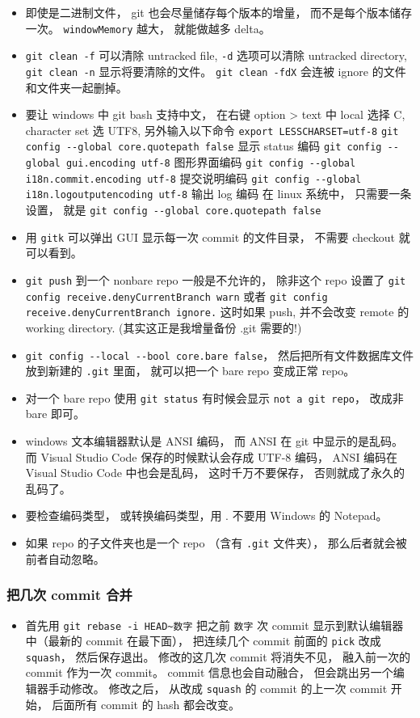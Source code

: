 \begin{itemize}
\item 即使是二进制文件， git 也会尽量储存每个版本的增量， 而不是每个版本储存一次。 \verb`windowMemory` 越大， 就能做越多 delta。
\item \verb`git clean -f` 可以清除 untracked file, \verb`-d` 选项可以清除 untracked directory,  \verb`git clean -n` 显示将要清除的文件。 \verb`git clean -fdX` 会连被 ignore 的文件和文件夹一起删掉。
\item 要让 windows 中 git bash 支持中文， 在右键 option > text 中 local 选择 C, character set 选 UTF8, 另外输入以下命令
\verb`export LESSCHARSET=utf-8`
\verb`git config --global core.quotepath false`     显示 status 编码
\verb`git config --global gui.encoding utf-8`    图形界面编码
\verb`git config --global i18n.commit.encoding utf-8`   提交说明编码
\verb`git config --global i18n.logoutputencoding utf-8` 输出 log 编码
在 linux 系统中， 只需要一条设置， 就是
\verb`git config --global core.quotepath false`
\item 用 \verb`gitk` 可以弹出 GUI 显示每一次 commit 的文件目录， 不需要 checkout 就可以看到。
\item \verb`git push` 到一个 nonbare repo 一般是不允许的， 除非这个 repo 设置了 \verb`git config receive.denyCurrentBranch warn` 或者 \verb`git config receive.denyCurrentBranch ignore.` 这时如果 push, 并不会改变 remote 的 working directory. (其实这正是我增量备份 .git 需要的!)
\item \verb`git config --local --bool core.bare false`， 然后把所有文件数据库文件放到新建的 \verb`.git` 里面， 就可以把一个 bare repo 变成正常 repo。
\item 对一个 bare repo 使用 \verb`git status` 有时候会显示 \verb`not a git repo`， 改成非 bare 即可。
\item windows 文本编辑器默认是 ANSI 编码， 而 ANSI 在 git 中显示的是乱码。 而 Visual Studio Code 保存的时候默认会存成 UTF-8 编码， ANSI 编码在 Visual Studio Code 中也会是乱码， 这时千万不要保存， 否则就成了永久的乱码了。
\item 要检查编码类型， 或转换编码类型，用 . 不要用 Windows 的 Notepad。
\item 如果 repo 的子文件夹也是一个 repo （含有 \verb`.git` 文件夹）， 那么后者就会被前者自动忽略。
\end{itemize}

\subsubsection{把几次 commit 合并}
\begin{itemize}
\item 首先用 \verb`git rebase -i HEAD~数字` 把之前 \verb`数字` 次 commit 显示到默认编辑器中（最新的 commit 在最下面）， 把连续几个 commit 前面的 \verb`pick` 改成 \verb`squash`， 然后保存退出。 修改的这几次 commit 将消失不见， 融入前一次的 commit 作为一次 commit。 commit 信息也会自动融合， 但会跳出另一个编辑器手动修改。 修改之后， 从改成 \verb`squash` 的 commit 的上一次 commit 开始， 后面所有 commit 的 hash 都会改变。
\end{itemize}


